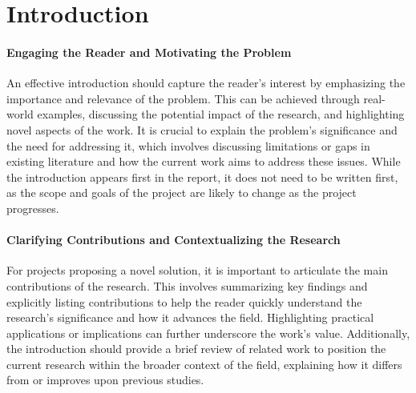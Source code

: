 \documentclass{article}
\title{\mytitle}
\begin{document}


\begin{abstract}
An abstract is a brief summary of a research article, thesis, review, conference proceeding, or any in-depth analysis of a particular subject or discipline. It is often used to help the reader quickly understand the paper's purpose. Abstracts are typically a single paragraph, between 150 and 250 words, and they highlight the main objectives, methods, results, and conclusions of the research. The purpose of an abstract is to provide a concise and accurate representation of the content of the paper, allowing readers to decide whether the full document will be of interest to them. This template is a good starting point from reporting results for machine learning projects. It follows a structure closely related to the one used for machine learning papers.

\end{abstract}

\section{Introduction}
\paragraph{Engaging the Reader and Motivating the Problem}
An effective introduction should capture the reader's interest by emphasizing the importance and relevance of the problem. This can be achieved through real-world examples, discussing the potential impact of the research, and highlighting novel aspects of the work. It is crucial to explain the problem's significance and the need for addressing it, which involves discussing limitations or gaps in existing literature and how the current work aims to address these issues. While the introduction appears first in the report, it does not need to be written first, as the scope and goals of the project are likely to change as the project progresses.

\paragraph{Clarifying Contributions and Contextualizing the Research}
For projects proposing a novel solution, it is important to articulate the main contributions of the research. This involves summarizing key findings and explicitly listing contributions to help the reader quickly understand the research's significance and how it advances the field. Highlighting practical applications or implications can further underscore the work's value. Additionally, the introduction should provide a brief review of related work to position the current research within the broader context of the field, explaining how it differs from or improves upon previous studies.
\end{document}
